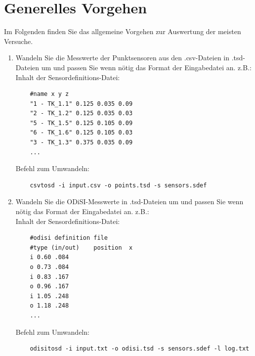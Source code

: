 \documentclass[10pt,a5paper,twoside,titlepage]{scrartcl}
\begin{document}
	\section{Generelles Vorgehen}
	Im Folgenden finden Sie das allgemeine Vorgehen zur Auswertung der meisten Versuche.
	\begin{enumerate}
	\item Wandeln Sie die Messwerte der Punktsensoren aus den .csv-Dateien in .tsd-Dateien um und passen Sie wenn nötig das Format der Eingabedatei an. z.B.:\\
	Inhalt der Sensordefinitions-Datei:
	\begin{lstlisting}
	#name x y z
	"1 - TK_1.1" 0.125 0.035 0.09
	"2 - TK_1.2" 0.125 0.035 0.03
	"5 - TK_1.5" 0.125 0.105 0.09
	"6 - TK_1.6" 0.125 0.105 0.03
	"3 - TK_1.3" 0.375 0.035 0.09
	...
	\end{lstlisting}	
	Befehl zum Umwandeln:
	\begin{lstlisting}
	csvtosd -i input.csv -o points.tsd -s sensors.sdef
	\end{lstlisting}	
	\item Wandeln Sie die ODiSI-Messwerte in .tsd-Dateien um und passen Sie wenn nötig das Format der Eingabedatei an. z.B.:\\
	Inhalt der Sensordefinitions-Datei:
	\begin{lstlisting}
	#odisi definition file
	#type (in/out)    position  x
	i 0.60 .084
	o 0.73 .084
	i 0.83 .167
	o 0.96 .167
	i 1.05 .248
	o 1.18 .248
	...
	\end{lstlisting}	
	Befehl zum Umwandeln:
	\begin{lstlisting}
	odisitosd -i input.txt -o odisi.tsd -s sensors.sdef -l log.txt
	\end{lstlisting}	
	

\end{enumerate}
\end{document}
